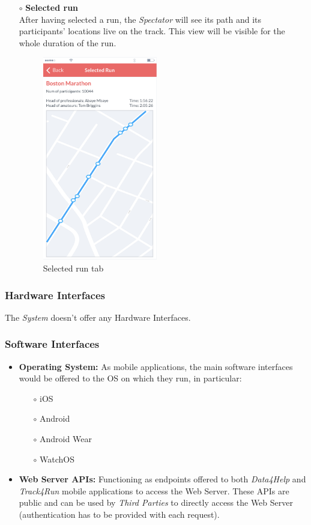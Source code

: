 \documentclass[titlepage]{article}
\begin{document}
\begin{itemize}
\begin{itemize}
\begin{itemize}
					\item[$\circ$] {\bf Selected run} \\
					After having selected a run, the {\it Spectator} will see its path and its participants’ locations live on the track. This view will be visible for the whole duration of the run.\\	
					\begin{figure}[H]
						\center
  						\includegraphics[width=5cm]{Mockup/mockupSelectedRun.png}
  						\caption{Selected run tab}
 					 	\label{fig:SelectedRun}
					\end{figure}
				\end{itemize}
			\end{itemize}
		\end{itemize}
						
		\subsubsection{Hardware Interfaces}
		The {\it System} doesn’t offer any Hardware Interfaces.
			
		\subsubsection{Software Interfaces}
		\begin{itemize}
			\item{\bf Operating System: } As mobile applications, the main software interfaces would be offered to the OS on which they run, in particular:
			\begin{itemize}
				\item[$\circ$] iOS
				\item[$\circ$]Android
				\item[$\circ$] Android Wear
				\item[$\circ$] WatchOS
			\end{itemize}
			\item{\bf Web Server APIs: } Functioning as endpoints offered to both {\it Data4Help} and {\it Track4Run} mobile applications to access the Web Server.
These APIs are public and can be used by {\it Third Parties} to directly access the Web Server (authentication has to be provided with each request).

		\end{itemize}
			
\end{document}
